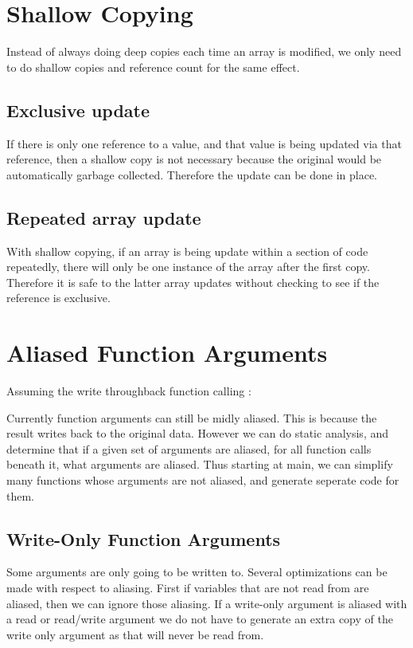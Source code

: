 \section{Shallow Copying}
Instead of always doing deep copies each time an array is modified, we only need to do shallow copies and reference count for the same effect.
\subsection{Exclusive update}
If there is only one reference to a value, and that value is being updated via that reference, then a shallow copy is not necessary because the original would be automatically garbage collected.
    Therefore the update can be done in place.
\subsection{Repeated array update}
With shallow copying, if an array is being update within a section of code repeatedly, there will only be one instance of the array after the first copy.
    Therefore it is safe to the latter array updates without checking to see if the reference is exclusive.

\section{Aliased Function Arguments}
Assuming the write through\/back function calling : 

Currently function arguments can still be midly aliased.
    This is because the result writes back to the original data.
    However we can do static analysis, and determine that if a given set of arguments are aliased, for all function calls beneath it, what arguments are aliased.
    Thus starting at main, we can simplify many functions whose arguments are not aliased, and generate seperate code for them.

\subsection{Write-Only Function Arguments}
Some arguments are only going to be written to.
    Several optimizations can be made with respect to aliasing.
    First if variables that are not read from are aliased, then we can ignore those aliasing.
    If a write-only argument is aliased with a read or read/write argument we do not have to generate an extra copy of the write only argument as that will never be read from.

